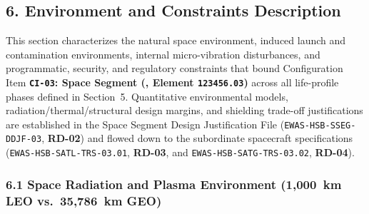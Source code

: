 \subsection{6. Environment and Constraints Description}

This section characterizes the natural space environment, induced launch and contamination environments, internal micro-vibration disturbances, and programmatic, security, and regulatory constraints that bound Configuration Item \textbf{\texttt{CI-03}: Space Segment (,  Element \texttt{123456.03})} across all life-profile phases defined in Section~5. Quantitative environmental models, radiation/thermal/structural design margins, and shielding trade-off justifications are established in the Space Segment Design Justification File (\texttt{EWAS-HSB-SSEG-DDJF-03}, \textbf{RD-02}) and flowed down to the subordinate spacecraft specifications (\texttt{EWAS-HSB-SATL-TRS-03.01}, \textbf{RD-03}, and \texttt{EWAS-HSB-SATG-TRS-03.02}, \textbf{RD-04}).

\subsubsection{6.1 Space Radiation and Plasma Environment (1,000~km LEO vs.\ 35,786~km GEO)}

